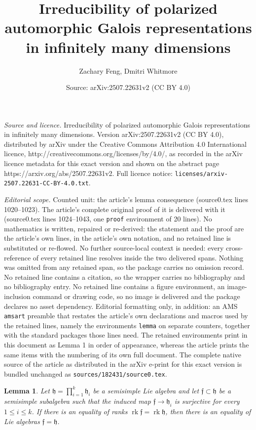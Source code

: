 \documentclass[10pt,a4paper]{amsart}
\title{Irreducibility of polarized automorphic Galois representations in infinitely many dimensions}
\author{Zachary Feng, Dmitri Whitmore}
\date{Source: arXiv:2507.22631v2 (CC BY 4.0)}
\newtheorem{lemma}{Lemma}
\newcommand{\mf}[1]{\mathfrak{#1}}
\newcommand{\rk}{\operatorname{rk}}
\begin{document}
\maketitle

\noindent\emph{Source and licence.} Irreducibility of polarized automorphic Galois representations in infinitely many dimensions. Version arXiv:2507.22631v2 (CC BY 4.0), distributed by arXiv under the Creative Commons Attribution 4.0 International licence, http://creativecommons.org/licenses/by/4.0/, as recorded in the arXiv licence metadata for this exact version and shown on the abstract page https://arxiv.org/abs/2507.22631v2. Full licence notice: \texttt{licenses/arxiv-2507.22631-CC-BY-4.0.txt}.\par\smallskip

\noindent\textit{Editorial scope.} Counted unit: the article's lemma consequence (source0.tex lines 1020--1023). The article's complete original proof of it is delivered with it (source0.tex lines 1024--1043, one \texttt{proof} environment of 20 lines). No mathematics is written, repaired or re-derived: the statement and the proof are the article's own lines, in the article's own notation, and no retained line is substituted or re-flowed.  No further source-local context is needed: every cross-reference of every retained line resolves inside the two delivered spans.  Nothing was omitted from any retained span, so the package carries no omission record.  No retained line contains a citation, so the wrapper carries no bibliography and no bibliography entry.  No retained line contains a figure environment, an image-inclusion command or drawing code, so no image is delivered and the package declares no asset dependency.  Editorial formatting only, in addition: an AMS \texttt{amsart} preamble that restates the article's own declarations and macros used by the retained lines, namely the environments \texttt{lemma} on separate counters, together with the standard packages those lines need.  The retained environments print in this document as Lemma 1 in order of appearance, whereas the article prints the same items with the numbering of its own full document.  The complete native source of the article as distributed in the arXiv e-print for this exact version is bundled unchanged as \texttt{sources/182431/source0.tex}.
\begin{lemma} \label{lemma: Goursat consequence}
Let $\mf{h} = \prod_{i=1}^k \mf{h}_i$ be a semisimple Lie algebra and let $\mf{f} \subset \mf{h}$ be a semisimple subalgebra such that the induced map $\mf{f} \to \mf{h}_i$ is surjective for every $1 \leq i \leq k$.
If there is an equality of ranks $\rk \mf{f} = \rk \mf{h}$, then there is an equality of Lie algebras $\mf{f} = \mf{h}$.
\end{lemma}
\end{document}
